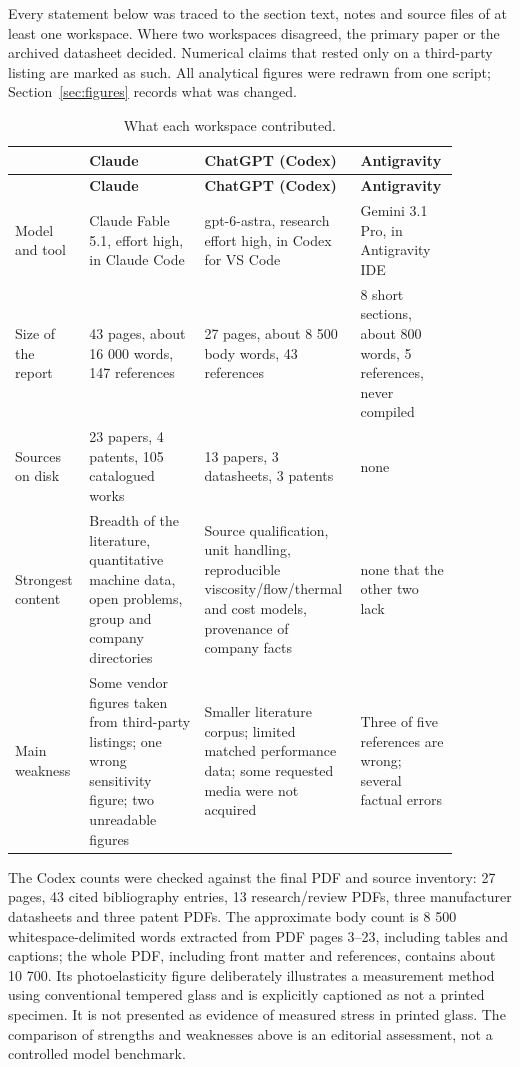 \documentclass[10pt,a4paper]{article}
\begin{document}
Every statement below was traced to the section text, notes and source files of at least one workspace. Where two workspaces disagreed, the primary paper or the archived datasheet decided. Numerical claims that rested only on a third-party listing are marked as such. All analytical figures were redrawn from one script; Section~\ref{sec:figures} records what was changed.

{\footnotesize
\begin{longtable}{@{}L{0.162\linewidth}L{0.257\linewidth}L{0.257\linewidth}L{0.209\linewidth}@{}}
  \caption{What each workspace contributed.}\label{tbl:workspaces}\\
  \toprule
   & \textbf{Claude} & \textbf{ChatGPT (Codex)} & \textbf{Antigravity} \\
  \midrule
  \endfirsthead
  \toprule
   & \textbf{Claude} & \textbf{ChatGPT (Codex)} & \textbf{Antigravity} \\
  \midrule
  \endhead
    Model and tool & Claude Fable 5.1, effort high, in Claude Code & gpt-6-astra, research effort high, in Codex for VS Code & Gemini 3.1 Pro, in Antigravity IDE \\
    Size of the report & 43 pages, about 16 000 words, 147 references & 27 pages, about 8 500 body words, 43 references & 8 short sections, about 800 words, 5 references, never compiled \\
    Sources on disk & 23 papers, 4 patents, 105 catalogued works & 13 papers, 3 datasheets, 3 patents & none \\
    Strongest content & Breadth of the literature, quantitative machine data, open problems, group and company directories & Source qualification, unit handling, reproducible viscosity/flow/thermal and cost models, provenance of company facts & none that the other two lack \\
    Main weakness & Some vendor figures taken from third-party listings; one wrong sensitivity figure; two unreadable figures & Smaller literature corpus; limited matched performance data; some requested media were not acquired & Three of five references are wrong; several factual errors \\
  \bottomrule
\end{longtable}
}

The Codex counts were checked against the final PDF and source inventory: 27 pages, 43 cited bibliography entries, 13 research/review PDFs, three manufacturer datasheets and three patent PDFs. The approximate body count is 8 500 whitespace-delimited words extracted from PDF pages 3--23, including tables and captions; the whole PDF, including front matter and references, contains about 10 700. Its photoelasticity figure deliberately illustrates a measurement method using conventional tempered glass and is explicitly captioned as not a printed specimen. It is not presented as evidence of measured stress in printed glass. The comparison of strengths and weaknesses above is an editorial assessment, not a controlled model benchmark.
\end{document}
